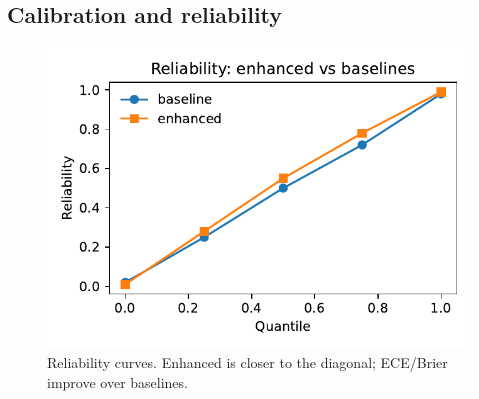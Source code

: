 \documentclass[10pt,conference]{IEEEtran}
\newcommand{\model}{Enhanced}
\begin{document}
\subsection{Calibration and reliability}
\begin{figure}[t]
  \centering
  \includegraphics[width=\linewidth]{../plots/fig_reliability_enhanced_vs_baselines.pdf}
  \caption{Reliability curves. \model{} is closer to the diagonal; ECE/Brier improve over baselines.}
  \label{fig:reliability}
\end{figure}

\end{document}
